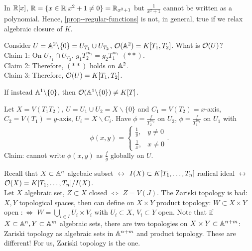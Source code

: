 \documentclass[a4paper,11pt]{article}
\begin{document}
			\begin{remark}
				In $\R[x]$, $\R=\{x\in\R|x^2+1\neq0\}=\R_{x^2+1}$ but $\frac{1}{x^2+1}$ cannot be written as a polynomial. Hence, \autoref{prop--regular-functions} is not, in general, true if we relax algebraic closure of $K$.
			\end{remark}

			\begin{eg}
				Consider $U=\AA^2\backslash\{0\}=U_{T_1}\cup U_{T_2}$, $\O(\AA^2)=K[T_1,T_2]$. What is $\O(U)$?\\
				Claim 1: On $U_{T_1}\cap U_{T_2}$, $g_1T_2^{m_2}=g_2T_1^{m_1}$ $(\ast\ast)$.\\
				Claim 2: Therefore, $(\ast\ast)$ holds on $\AA^2$.\\
				Claim 3: Therefore, $\O(U)=K[T_1,T_2]$.
			\end{eg}

			\begin{exc}
				If instead $\AA^1\backslash\{0\}$, then $\O(\AA^1\backslash\{0\})\neq K[T]$.
			\end{exc}

			\begin{eg}
				Let $X=V(T_1T_2)$, $U=U_1\cup U_2=X\backslash\{0\}$ and $C_1=V(T_2)=x$-axis, $C_2=V(T_1)=y$-axis, $U_i=X\backslash C_i$. Have $\phi=\frac{f}{T_2^{m_2}}$ on $U_2$, $\phi=\frac{f}{T_1^{m_1}}$ on $U_1$ with
				\begin{equation*}
					\phi(x,y)=
					\begin{cases}
						\frac{1}{y}, & y\neq0\\
						\frac{1}{x}, & x\neq0	
					\end{cases}.
				\end{equation*}
				Claim: cannot write $\phi(x,y)$ as $\frac{f}{g}$ globally on $U$.
			\end{eg}

			Recall that $X\subset\AA^n$ algebaic subset $\longleftrightarrow$ $I(X)\subset \K$ radical ideal $\longleftrightarrow$ $\O(X)=\K/I(X)$.
			\\

			Let $X$ algebraic set, $Z\subset X$ closed $\Longleftrightarrow$ $Z=V(J)$. The Zariski topology is bad: $X,Y$ topological spaces, then can define on $X\times Y$ product topology: $W\subset X\times Y$ open $:\Longleftrightarrow$ $W=\bigcup_{i\in I}U_i\times V_i$ with $U_i\subset X$, $V_i\subset Y$ open. Note that if $X\subset\AA^n,Y\subset\AA^m$ algebraic sets, there are two topologies on $X\times Y\subset\AA^{n+m}$: Zariski topology as algebraic sets in $\AA^{n+m}$ and product topology. These are different! For us, Zariski topology is the  one.
\end{document}
